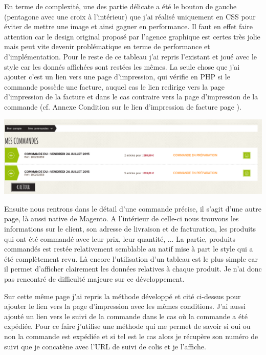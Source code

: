 \documentclass[a4paper,11pt,twoside]{report}
\begin{document}
    	En terme de complexité, une des partie délicate a été le bouton de gauche (pentagone avec une croix à l'intérieur) que j'ai réalisé uniquement en CSS pour éviter de mettre une image et ainsi gagner en performance. Il faut en effet faire attention car le design original proposé par l'agence graphique est certes très jolie mais peut vite devenir problématique en terme de performance et d'implémentation. Pour le reste de ce tableau j'ai repris l'existant et joué avec le style car les donnés affichées sont restées les mêmes. La seule chose que j'ai ajouter c'est un lien vers une page d'impression, qui vérifie en PHP si le commande possède une facture, auquel cas le lien redirige vers la page d'impression de la facture et dans le cas contraire vers la page d'impression de la commande (cf. Annexe Condition sur le lien d'impression de facture page \pageref{SL_print_condition}).
	
	\begin{center}
	  \includegraphics[width=\textwidth]{images/SL_command_history.png} 
	  \label{SL_command_history}
	\end{center}
    
    	Ensuite nous rentrons dans le détail d'une commande précise, il s'agit d'une autre page, là aussi native de Magento. A l'intérieur de celle-ci nous trouvons les informations sur le client, son adresse de livraison et de facturation, les produits qui ont été commandé avec leur prix, leur quantité, ... La partie, produits commandés est restée relativement semblable au natif mise à part le style qui a été complètement revu. Là encore l'utilisation d'un tableau est le plus simple car il permet d'afficher clairement les données relatives à chaque produit. Je n'ai donc pas rencontré de difficulté majeure sur ce développement.
    
    	Sur cette même page j'ai repris la méthode développé et cité ci-dessus pour ajouter le lien vers la page d'impression avec les mêmes conditions. J'ai aussi ajouté un lien vers le suivi de la commande dans le cas où la commande a été expédiée. Pour ce faire j'utilise une méthode qui me permet de savoir si oui ou non la commande est expédiée et si tel est le cas alors je récupère son numéro de suivi que je concatène avec l'URL de suivi de colis et je l'affiche.
    
\end{document}

